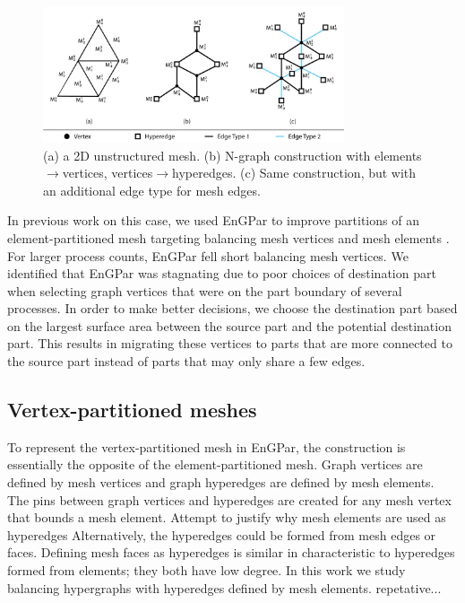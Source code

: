 \documentclass[conference]{IEEEtran}
\begin{document}
\begin{figure}[!ht]
  \centering
  \includegraphics[width=3.5in]{../figures/exampleMesh2Graph.png}
  \caption{(a) a 2D unstructured mesh. (b) N-graph construction with elements$\rightarrow$vertices, vertices$\rightarrow$hyperedges. (c) Same construction, but with an additional edge type for mesh edges.}
  \label{fig:mesh2graph}
\end{figure}

In previous work on this case, we used EnGPar to improve partitions of an
element-partitioned mesh targeting balancing mesh vertices and mesh elements \cite{engparSC17}.
For larger process counts, EnGPar fell short balancing mesh vertices.
We identified that EnGPar was stagnating due to poor choices of destination part
when selecting graph vertices that were on the part boundary of several processes. In order
to make better decisions, we choose the destination part based on the largest surface area
between the source part and the potential destination part. This results in migrating these
vertices to parts that are more connected to the source part instead of parts that may only
share a few edges.

\subsection{Vertex-partitioned meshes}

To represent the vertex-partitioned mesh in EnGPar, the construction
is essentially the opposite of the element-partitioned mesh. Graph
vertices are defined by mesh vertices and graph hyperedges are defined
by mesh elements. The pins between graph vertices and hyperedges are
created for any mesh vertex that bounds a mesh element.
{\color{red} Attempt to justify why mesh elements are used as hyperedges}
Alternatively, the hyperedges could be formed from mesh edges or faces.
Defining mesh faces as hyperedges is similar in characteristic to hyperedges
formed from elements; they both have low degree.
In this work we study balancing hypergraphs with hyperedges defined by mesh
elements. {\color{red} repetative...}
\end{document}

